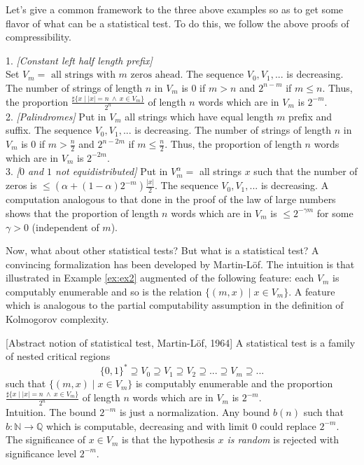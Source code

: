 Let's give a common framework to the three above examples
so as to get some flavor of what can be a statistical test.
To do this, we follow the above proofs of compressibility.
\begin{example}\label{ex:ex2}
1. {\em [Constant left half length prefix]}\\
Set $V_m = \mbox{ all strings with $m$ zeros ahead}$.
The sequence $V_0,V_1,...$ is decreasing.
The number of strings of length $n$ in $V_m$ is $0$ if $m>n$
and $2^{n-m}$ if $m\leq n$.
Thus, the proportion
$\frac{\sharp\{x \mid |x|=n\ \wedge\ x\in V_m\}}{2^n}$
of length $n$ words which are in $V_m$ is $2^{-m}$.
\medskip\\
2. {\em [Palindromes]}
Put in $V_m$ all strings which have equal length $m$
prefix and suffix.
The sequence $V_0,V_1,...$ is decreasing.
The number of strings of length $n$ in $V_m$ is
$0$ if $m>\frac{n}{2}$
and $2^{n-2m}$ if $m\leq \frac{n}{2}$.
Thus, the proportion of length $n$ words which are in $V_m$
is $2^{-2m}$.
\medskip\\
3. {\em [$0$ and $1$ not equidistributed]}
Put in $V^\alpha_m =$ all strings $x$ such that
the number of zeros is
$\leq (\alpha+(1-\alpha)2^{-m})\frac{|x|}{2}$.
The sequence $V_0,V_1,...$ is decreasing.
A computation analogous to that done in the proof of the law
of large numbers shows that the proportion of length $n$ words
which are in $V_m$ is $\leq 2^{-\gamma m}$ for some $\gamma>0$
(independent of $m$).
\end{example}
Now, what about other statistical tests?
But what is a statistical test?
A convincing formalization has been developed by Martin-L\"of.
The intuition is that illustrated in Example \ref{ex:ex2}
augmented of the following feature:
each $V_m$ is computably enumerable and so is the relation
$\{(m,x) \mid x\in V_m\}$.
A feature which is analogous to the partial computability
assumption in the definition of Kolmogorov complexity.
\begin{definition}\label{def:test}
[Abstract notion of statistical test, Martin-L\"of, 1964]
A statistical test is a family of nested critical regions
$$
\{0,1\}^*\supseteq V_0\supseteq V_1\supseteq V_2\supseteq
...\supseteq V_m\supseteq...
$$
such that $\{(m,x) \mid x\in V_m\}$ is computably enumerable
and the proportion
$\frac{\sharp\{x \mid |x|=n\ \wedge\ x\in V_m\}}{2^n}$
of length $n$ words which are in $V_m$ is $2^{-m}$.
\medskip\\
Intuition. The bound $2^{-m}$ is just a normalization.
Any bound $b(n)$ such that $b:{\mathbb N}\to{\mathbb Q}$ which is computable, 
decreasing and with limit $0$ could replace $2^{-m}$. 
\\
The significance of $x\in V_m$ is that the hypothesis
{\em $x$ is random} is rejected with significance level $2^{-m}$.
\end{definition}
